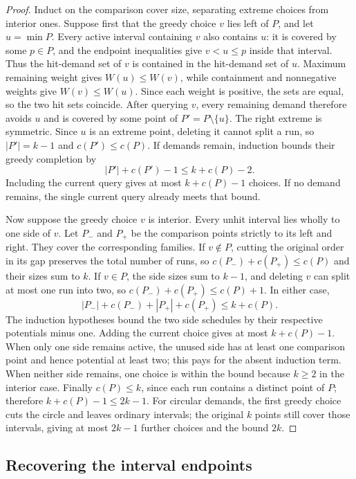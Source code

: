\begin{proof}
Induct on the comparison cover size, separating extreme choices from
interior ones. Suppose first that the greedy choice $v$ lies left
of $P$, and let $u=\min P$. Every active interval containing $v$ also
contains $u$: it is covered by some $p\in P$, and the endpoint
inequalities give $v<u\le p$ inside that interval. Thus the hit-demand
set of $v$ is contained in the hit-demand set of $u$. Maximum remaining
weight gives $W(u)\le W(v)$, while containment and nonnegative weights
give $W(v)\le W(u)$. Since each weight is positive, the sets are equal,
so the two hit sets coincide. After querying $v$, every remaining
demand therefore avoids $u$ and is covered by some point of
$P'=P\setminus\{u\}$. The right extreme is symmetric. Since $u$ is an
extreme point, deleting it cannot split a run, so
$|P'|=k-1$ and $c(P')\le c(P)$. If demands remain, induction bounds
their greedy completion by
\[
 |P'|+c(P')-1\le k+c(P)-2.
\]
Including the current query gives at most $k+c(P)-1$ choices. If no
demand remains, the single current query already meets that bound.

Now suppose the greedy choice $v$ is interior. Every unhit interval lies wholly to one
side of $v$. Let $P_-$ and $P_+$ be the comparison points strictly to
its left and right. They cover the corresponding families. If $v\notin
P$, cutting the original order in its gap preserves the total number
of runs, so $c(P_-)+c(P_+)\le c(P)$ and their sizes sum to $k$.
If $v\in P$, the side sizes sum to $k-1$, and deleting $v$ can split
at most one run into two, so $c(P_-)+c(P_+)\le c(P)+1$. In either
case,
\[
 |P_-|+c(P_-)+|P_+|+c(P_+)\le k+c(P).
\]
The induction hypotheses bound the two side schedules by their
respective potentials minus one. Adding the current choice gives at
most $k+c(P)-1$. When only one side remains active, the unused side
has at least one comparison point and hence potential at least two;
this pays for the absent induction term. When neither side remains,
one choice is within the bound because $k\ge2$ in the interior case.
Finally $c(P)\le k$, since each run contains a distinct point of $P$;
therefore $k+c(P)-1\le2k-1$. For circular demands, the first greedy
choice cuts the circle and leaves ordinary intervals; the original
$k$ points still cover those intervals, giving at most $2k-1$ further
choices and the bound $2k$.
\end{proof}

\subsection{Recovering the interval endpoints}
\label{sec:endpoint-geometry}

